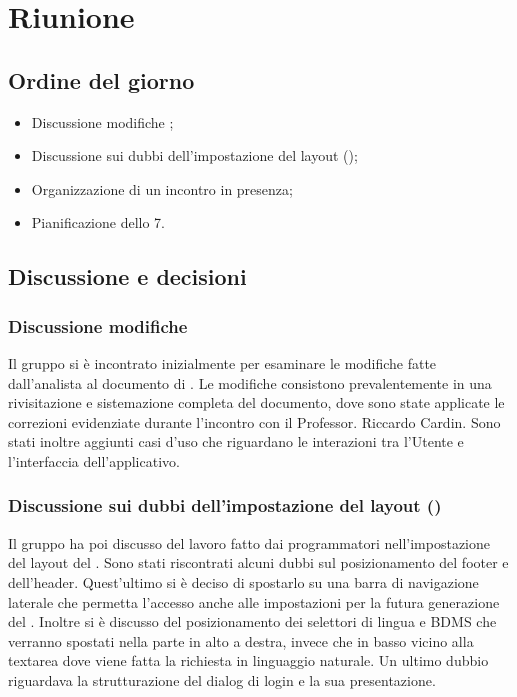 \section{Riunione}
\subsection{Ordine del giorno}
\begin{itemize}
	\item Discussione modifiche \AdR;
	\item Discussione sui dubbi dell'impostazione del layout ();
	\item Organizzazione di un incontro in presenza;
	\item Pianificazione dello  7.
\end{itemize}

\subsection{Discussione e decisioni}
\subsubsection{Discussione modifiche \AdR}
\par Il gruppo si è incontrato inizialmente per esaminare le modifiche fatte dall'analista al documento di \AdR. Le modifiche consistono prevalentemente in una rivisitazione e sistemazione completa del documento, dove sono state applicate le correzioni evidenziate durante l'incontro con il Professor. Riccardo Cardin. Sono stati inoltre aggiunti casi d'uso che riguardano le interazioni tra l'Utente e l'interfaccia dell'applicativo.

\subsubsection{Discussione sui dubbi dell'impostazione del layout ()}
\par Il gruppo ha poi discusso del lavoro fatto dai programmatori nell'impostazione del layout del . Sono stati riscontrati alcuni dubbi sul posizionamento del footer e dell'header. Quest'ultimo si è deciso di spostarlo su una barra di navigazione laterale che permetta l'accesso anche alle impostazioni per la futura generazione del . Inoltre si è discusso del posizionamento dei selettori di lingua e BDMS che verranno spostati nella parte in alto a destra, invece che in basso vicino alla textarea dove viene fatta la richiesta in linguaggio naturale. Un ultimo dubbio riguardava la strutturazione del dialog di login e la sua presentazione.

